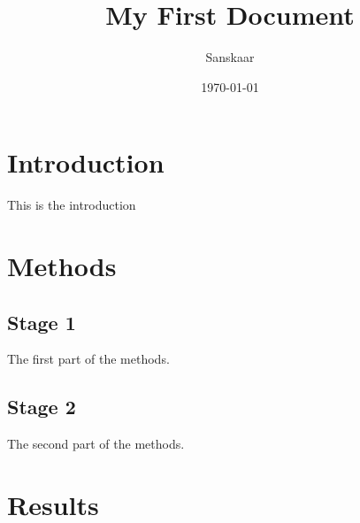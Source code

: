 \documentclass[a4paper,12pt]{report}
\begin{document}
	\title{My First Document}
	\author{Sanskaar}
	\date{\today}
	\maketitle
	\tableofcontents
	\newpage
	\section{Introduction}
	{\huge This is the introduction}
	 \section{Methods}
	\subsection{Stage 1}

	The first part of the methods.
	\subsection{Stage 2}
	The second part of the methods.
	\section{Results}
\end{document}
